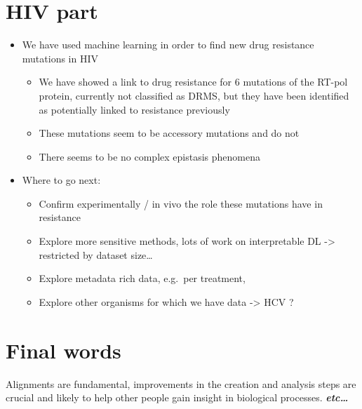 \documentclass[
  11pt,
  twoside]{scrbook}
\begin{document}
\hypertarget{hiv-part}{%
\section*{HIV part}\label{hiv-part}}

\begin{itemize}
\item
  We have used machine learning in order to find new drug resistance mutations in HIV

  \begin{itemize}
  \item
    We have showed a link to drug resistance for 6 mutations of the RT-pol protein, currently not classified as DRMS, but they have been identified as potentially linked to resistance previously
  \item
    These mutations seem to be accessory mutations and do not
  \item
    There seems to be no complex epistasis phenomena
  \end{itemize}
\item
  Where to go next:

  \begin{itemize}
  \item
    Confirm experimentally / in vivo the role these mutations have in resistance
  \item
    Explore more sensitive methods, lots of work on interpretable DL -\textgreater{} restricted by dataset size\ldots{}
  \item
    Explore metadata rich data, e.g.~per treatment,
  \item
    Explore other organisms for which we have data -\textgreater{} HCV ?
  \end{itemize}
\end{itemize}

\hypertarget{final-words}{%
\section*{Final words}\label{final-words}}

Alignments are fundamental, improvements in the creation and analysis steps are crucial and likely to help other people gain insight in biological processes. \textbf{\emph{etc\ldots{}}}

\appendix

\end{document}
